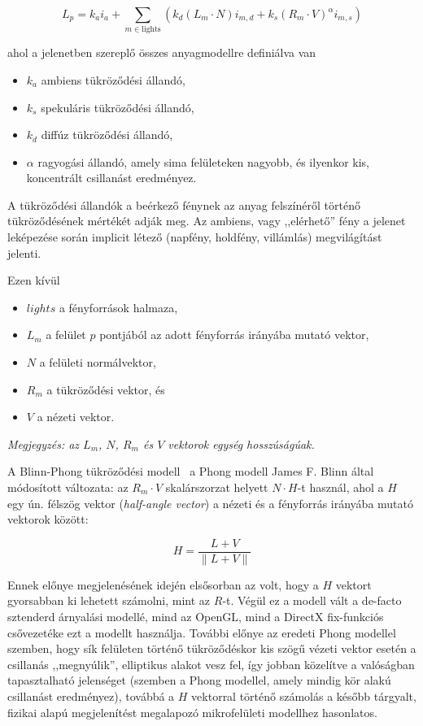 \[
L_{p} = k_a i_a + \sum_{m \in \textrm{lights}} {\left( k_d (L_m \cdot N) i_{m,d} + k_s(R_m \cdot V)^\alpha i_{m,s} \right)}
\]

\noindent
ahol a jelenetben szereplő összes anyagmodellre definiálva van

\begin{itemize}[noitemsep]
\item \(k_a\) ambiens tükröződési állandó,
\item \(k_s\) spekuláris tükröződési állandó,
\item \(k_d\) diffúz tükröződési állandó,
\item \(\alpha\) ragyogási állandó, amely sima felületeken nagyobb, és ilyenkor kis, koncentrált csillanást eredményez.
\end{itemize}

A tükröződési állandók a beérkező fénynek az anyag felszínéről történő tükröződésének mértékét adják meg. Az ambiens, vagy ,,elérhető'' fény a jelenet leképezése során implicit létező (napfény, holdfény, villámlás) megvilágítást jelenti.

\vspace{12pt}
\noindent
Ezen kívül

\begin{itemize}[noitemsep]
\item \(lights\) a fényforrások halmaza,
\item \(L_m\) a felület \(p\) pontjából az adott fényforrás irányába mutató vektor,
\item \(N\) a felületi normálvektor,
\item \(R_m\) a tükröződési vektor, és
\item \(V\) a nézeti vektor.
\end{itemize}

\noindent
\textit{Megjegyzés: az \(L_m\), \(N\), \(R_m\) és \(V\) vektorok egység hosszúságúak.}

\vspace{12pt}

A Blinn-Phong tükröződési modell~\cite{blinn1977models} a Phong modell James F. Blinn által módosított változata: az \(R_m \cdot V\) skalárszorzat helyett \(N \cdot H\)-t használ, ahol a \(H\) egy ún. félszög vektor (\textit{half-angle vector}) a nézeti és a fényforrás irányába mutató vektorok között:

\[
H = \frac{ L + V }{ \| L + V \| }
\]

Ennek előnye megjelenésének idején elsősorban az volt, hogy a \(H\) vektort gyorsabban ki lehetett számolni, mint az \(R\)-t. Végül ez a modell vált a de-facto sztenderd árnyalási modellé, mind az OpenGL, mind a DirectX fix-funkciós csővezetéke ezt a modellt használja. További előnye az eredeti Phong modellel szemben, hogy sík felületen történő tükröződéskor kis szögű vézeti vektor esetén a csillanás ,,megnyúlik'', elliptikus alakot vesz fel, így jobban közelítve a valóságban tapasztalható jelenséget (szemben a Phong modellel, amely mindig kör alakú csillanást eredményez), továbbá a \(H\) vektorral történő számolás a később tárgyalt, fizikai alapú megjelenítést megalapozó mikrofelületi modellhez hasonlatos.

